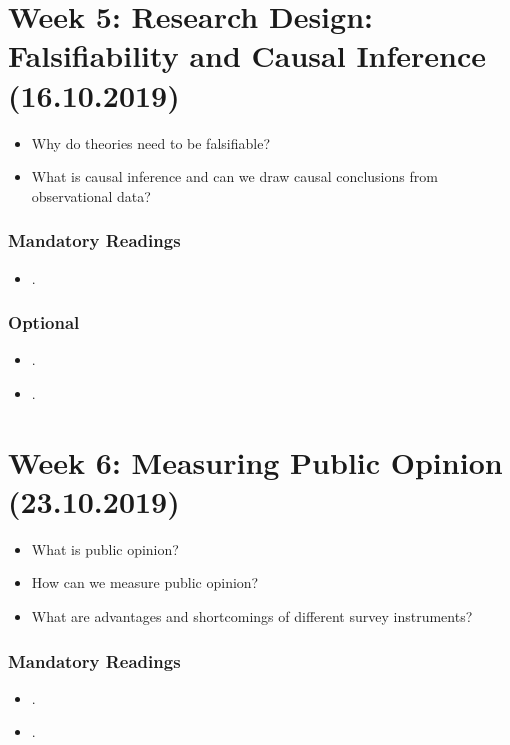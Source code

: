 \documentclass[abstract=on,parskip=full,headings=standardclasses,fontsize=11pt,paper=a4]{scrartcl}
\begin{document}
\section{Week 5: Research Design: Falsifiability and Causal Inference (16.10.2019)}

\begin{itemize}
\item  Why do theories need to be falsifiable?
\item What is causal inference and can we draw causal conclusions from observational data?
\end{itemize}


\subsubsection*{Mandatory Readings}
\begin{itemize}
\item {}.
\end{itemize}


\subsubsection*{Optional}
\begin{itemize}
\item {}.
\item {}.
\end{itemize}





\section{Week 6: Measuring Public Opinion (23.10.2019)}


\begin{itemize}
\renewcommand\labelitemi{--}
\item What is public opinion?
\item How can we measure public opinion? 
\item What are advantages and shortcomings of different survey instruments?
\end{itemize}


\subsubsection*{Mandatory Readings}
\begin{itemize}
\item {}.
\item {}.
\end{itemize}
\end{document}

